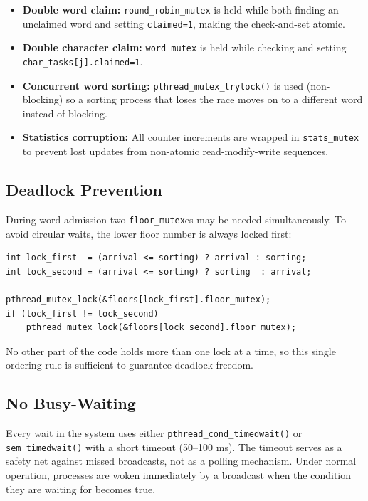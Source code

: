 \documentclass[12pt,a4paper]{article}
\newcommand{\code}[1]{\texttt{\small #1}}
\begin{document}
\begin{itemize}
  \item \textbf{Double word claim:} \code{round\_robin\_mutex} is held while both
        finding an unclaimed word and setting \code{claimed=1}, making the
        check-and-set atomic.
  \item \textbf{Double character claim:} \code{word\_mutex} is held while checking
        and setting \code{char\_tasks[j].claimed=1}.
  \item \textbf{Concurrent word sorting:} \code{pthread\_mutex\_trylock()} is used
        (non-blocking) so a sorting process that loses the race moves on to a
        different word instead of blocking.
  \item \textbf{Statistics corruption:} All counter increments are wrapped in
        \code{stats\_mutex} to prevent lost updates from non-atomic
        read-modify-write sequences.
\end{itemize}

\subsection{Deadlock Prevention}

During word admission two \code{floor\_mutex}es may be needed simultaneously.
To avoid circular waits, the lower floor number is always locked first:

\begin{lstlisting}[language=C_custom, caption={Lock ordering for deadlock prevention.}]
int lock_first  = (arrival <= sorting) ? arrival : sorting;
int lock_second = (arrival <= sorting) ? sorting  : arrival;

pthread_mutex_lock(&floors[lock_first].floor_mutex);
if (lock_first != lock_second)
    pthread_mutex_lock(&floors[lock_second].floor_mutex);
\end{lstlisting}

No other part of the code holds more than one lock at a time, so this single
ordering rule is sufficient to guarantee deadlock freedom.

\subsection{No Busy-Waiting}

Every wait in the system uses either \code{pthread\_cond\_timedwait()} or
\code{sem\_timedwait()} with a short timeout (50--100 ms). The timeout serves as
a safety net against missed broadcasts, not as a polling mechanism. Under normal
operation, processes are woken immediately by a broadcast when the condition
they are waiting for becomes true.
\end{document}

